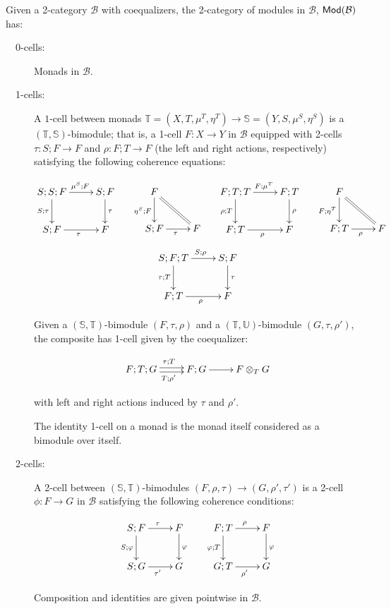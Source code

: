 \begin{definition}
Given a 2-category $\mathcal B$ with coequalizers,
the 2-category of modules in $\mathcal B$, ${\sf Mod}(\mathcal{B})$ has:

\begin{description}
\item[\ \ 0-cells:] Monads in $\mathcal B$.
\item[\ \ 1-cells:] A $1$-cell between monads $\mathbb{T}=(X,T,\mu^T,\eta^T)\to \mathbb{S}=(Y,S,\mu^S,\eta^S)$ is a $(\mathbb{T},\mathbb{S})$-bimodule; that is, a 1-cell $F:X\to Y$ in $\mathcal B$ equipped with 2-cells $\tau:S;F\to F$ and $\rho:F;T\to F$ (the left and right actions, respectively) satisfying the following coherence equations: 


$$
\xymatrix{
 S;S;F \ar[r]^{\ \mu^S;F} \ar[d]_{S;\tau}
  & S;F \ar[d]^{\tau}
\\S;F \ar[r]_{\tau}
  &F
}
\hspace{.5cm}
\xymatrix{
  F \ar@{=}[dr] \ar[d]_{\eta^S;F} 
\\S;F \ar[r]_{\tau}
   & F
}
\hspace{.5cm}
\xymatrix{
 F;T;T \ar[r]^{\ F;\mu^T} \ar[d]_{\rho;T}
  & F;T \ar[d]^{\rho}
\\F;T \ar[r]_{\rho}
  &F
}
\hspace{.5cm}
\xymatrix{
  F \ar@{=}[dr] \ar[d]_{F;\eta^T} 
\\F;T \ar[r]_{\rho}
   & F
}
$$
$$
\xymatrix{
S;F;T \ar[r]^{S;\rho} \ar[d]_{\tau;T}
& S;F \ar[d]^{\tau}\\
F;T \ar[r]_{\rho}
& F
}
$$


Given a $(\mathbb{S},\mathbb{T})$-bimodule $(F,\tau,\rho)$ and a  $(\mathbb{T},\mathbb{U})$-bimodule $(G,\tau,\rho')$, the composite has 1-cell given by the coequalizer:

$$
\xymatrix{
F;T;G  \ar@<-.5ex>[r]_{T;\rho'} \ar@<.5ex>[r]^{\tau;T} & F;G \ar[r] &F \otimes_T G 
}
$$

with left and right actions induced by $\tau$ and $\rho'$.

The identity 1-cell on a monad is the monad itself considered as a bimodule over itself.

\item[\ \ 2-cells:] A 2-cell between $(\mathbb{S},\mathbb{T})$-bimodules $(F,\rho,\tau)\to (G,\rho',\tau')$ is a 2-cell $\phi:F\to G$ in $\mathcal{B}$ satisfying the following coherence conditions:

$$
\xymatrix{
  S;F \ar[r]^{\tau}  \ar[d]_{S;\phi}
   & F \ar[d]^{\phi}
\\S;G \ar[r]_{\tau'}
   &G
}
\hspace*{.5cm}
\xymatrix{
  F;T \ar[r]^{\rho}  \ar[d]_{\phi;T}
   & F \ar[d]^{\phi}
\\G;T \ar[r]_{\rho'}
   &G
}
$$

Composition and identities are given pointwise in $\mathcal B$.
\end{description}
\end{definition}

